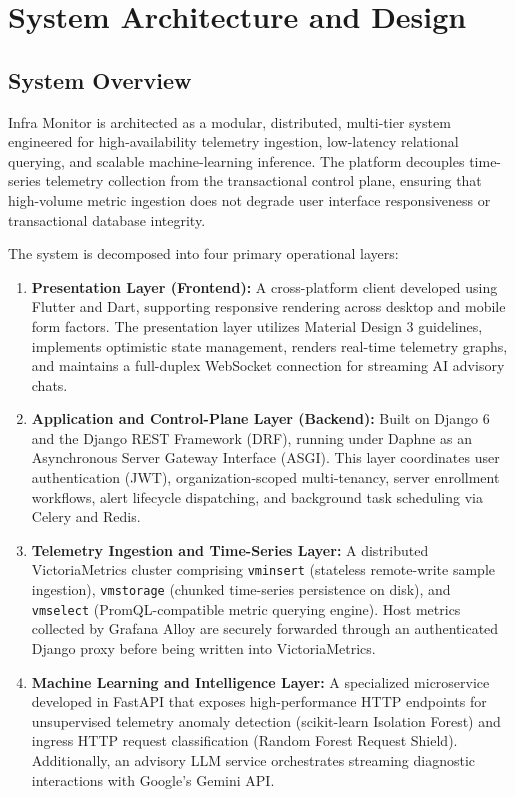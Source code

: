 \chapter{System Architecture and Design}

\section{System Overview}
Infra Monitor is architected as a modular, distributed, multi-tier system engineered for high-availability telemetry ingestion, low-latency relational querying, and scalable machine-learning inference. The platform decouples time-series telemetry collection from the transactional control plane, ensuring that high-volume metric ingestion does not degrade user interface responsiveness or transactional database integrity.

The system is decomposed into four primary operational layers:

\begin{enumerate}
  \item \textbf{Presentation Layer (Frontend):} A cross-platform client developed using Flutter and Dart, supporting responsive rendering across desktop and mobile form factors. The presentation layer utilizes Material Design 3 guidelines, implements optimistic state management, renders real-time telemetry graphs, and maintains a full-duplex WebSocket connection for streaming AI advisory chats.
  
  \item \textbf{Application and Control-Plane Layer (Backend):} Built on Django 6 and the Django REST Framework (DRF), running under Daphne as an Asynchronous Server Gateway Interface (ASGI). This layer coordinates user authentication (JWT), organization-scoped multi-tenancy, server enrollment workflows, alert lifecycle dispatching, and background task scheduling via Celery and Redis.
  
  \item \textbf{Telemetry Ingestion and Time-Series Layer:} A distributed VictoriaMetrics cluster comprising \texttt{vminsert} (stateless remote-write sample ingestion), \texttt{vmstorage} (chunked time-series persistence on disk), and \texttt{vmselect} (PromQL-compatible metric querying engine). Host metrics collected by Grafana Alloy are securely forwarded through an authenticated Django proxy before being written into VictoriaMetrics.
  
  \item \textbf{Machine Learning and Intelligence Layer:} A specialized microservice developed in FastAPI that exposes high-performance HTTP endpoints for unsupervised telemetry anomaly detection (scikit-learn Isolation Forest) and ingress HTTP request classification (Random Forest Request Shield). Additionally, an advisory LLM service orchestrates streaming diagnostic interactions with Google's Gemini API.
\end{enumerate}

